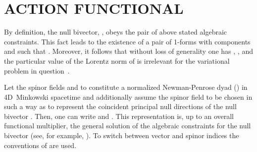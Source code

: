 \documentclass[a4paper,twocolumn,showkeys,showpacs,aps]{revtex4}
\begin{document}
\section{ACTION FUNCTIONAL}

By definition, the null bivector, \coordHE{}, obeys the pair of
above stated algebraic constraints. This fact leads to the
existence of a pair of 1-forms with components \coordHE{} and
\coordHE{} such that \coordHE{}. Moreover, it follows that without loss of
generality one has \coordHE{}, \coordHE{}, and the
particular value of the Lorentz norm of \coordHE{} is irrelevant for
the variational problem in question~\cite{Schouten}.

Let the spinor fields \coordHE{}\hspace{1ex} and
\coordHE{}\hspace{1ex} to con\-s\-ti\-tu\-te a normalized
Newman-Penrose dyad (\coordHE{}) in
4D~Minkowski spacetime and additionally assume the spinor field
\coordHE{} to be chosen in such a way as to represent the
coincident principal null directions of the null bivector
\coordHE{}. Then, one can write \coordHE{} and \coordHE{}. This
representation is, up to an overall functional multiplier, the
general solution of the algebraic constraints for the null
bivector \coordHE{} (see, for example, \cite{SST}). To switch
between vector and spinor indices the conventions of \cite{SST}
are used.
\end{document}
